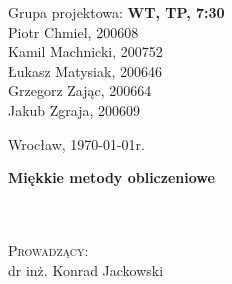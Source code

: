 \noindent
\begin{minipage}[t]{.5\linewidth}
	\begin{flushleft}
		Grupa projektowa: \textbf{WT, TP, 7:30}\\
		\vspace{0.8cm}
		Piotr Chmiel, 200608\\
		Kamil Machnicki, 200752\\
		Łukasz Matysiak, 200646\\
		Grzegorz Zając, 200664\\
		Jakub Zgraja, 200609\\
	\end{flushleft} 
\end{minipage}%
\begin{minipage}[t]{.5\linewidth}
	\begin{flushright}
		Wrocław, \today r.\\
		\vspace{.35cm}

	\end{flushright}
\end{minipage}

\vspace{3.0cm}

\begin{center}
	{\Huge\bf Miękkie metody obliczeniowe}\\
		
	 \\ 
	 \\
	

\end{center}


\vspace{2cm}
\begin{center}
		\textsc{Prowadzący:}\\
		dr inż. Konrad Jackowski
\end{center}
